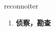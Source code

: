 
\begin{frame}
{\huge reconnoiter}
\begin{center}
\begin{enumerate}\Large
  \item \textbf{侦察，勘查}
\end{enumerate}
\end{center}
\end{frame}
